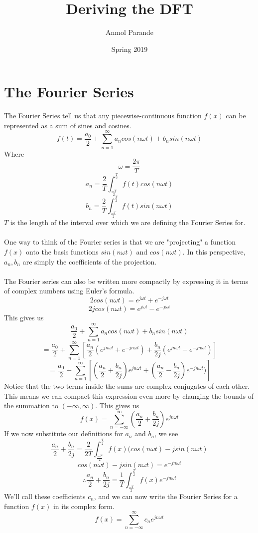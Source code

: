 \documentclass{article}
\begin{document}
\title{Deriving the DFT}
\author{Anmol Parande}
\date{Spring 2019}
\maketitle
\section{The Fourier Series}
The Fourier Series tell us that any piecewise-continuous function $f(x)$ can be represented as a sum of sines and cosines.
$$f(t) = \frac{a_0}{2} + \sum_{n=1}^{\infty}{a_n cos(n\omega t)+b_n sin(n\omega t)}$$
Where
$$\omega = \frac{2\pi}{T}$$
$$a_n = \frac{2}{T}\int_{\frac{-T}{2}}^{\frac{T}{2}}{f(t)cos(n\omega t)}$$
$$b_n = \frac{2}{T}\int_{\frac{-T}{2}}^{\frac{T}{2}}{f(t)sin(n\omega t)}$$
$T$ is the length of the interval over which we are defining the Fourier Series for.\\\\
One way to think of the Fourier series is that we are "projecting" a function $f(x)$
onto the basis functions $sin(n\omega t)$ and $cos(n\omega t)$. In this perspective,
$a_n, b_n$ are simply the coefficients of the projection.\\\\
The Fourier series can also be written more compactly by expressing it in terms of complex numbers using Euler's formula.
$$2cos(n\omega t)=e^{j\omega t}+e^{-j\omega t}$$
$$2jcos(n\omega t)=e^{j\omega t}-e^{-j\omega t}$$
This gives us
$$\frac{a_0}{2} + \sum_{n=1}^{\infty}{a_n cos(n\omega t)+b_n sin(n\omega t)}$$
$$=\frac{a_0}{2} + \sum_{n=1}^{\infty}{\left[\frac{a_n}{2}(e^{jn\omega t}+e^{-jn\omega t})+\frac{b_n}{2j}(e^{jn\omega t}-e^{-jn\omega t})\right]}$$
$$=\frac{a_0}{2} + \sum_{n=1}^{\infty}{\left[(\frac{a_n}{2} + \frac{b_n}{2j})e^{jn\omega t}+(\frac{a_n}{2} - \frac{b_n}{2j})e^{-jn\omega t})\right]}$$
Notice that the two terms inside the sums are complex conjugates of each other.
This means we can compact this expression even more by changing the bounds of the summation to $(-\infty, \infty)$.
This gives us $$f(x) = \sum_{n=-\infty}^{\infty}{(\frac{a_n}{2} + \frac{b_n}{2j})e^{jn\omega t}}$$
If we now substitute our definitions for $a_n$ and $b_n$, we see
$$\frac{a_n}{2}+\frac{b_n}{2j} = \frac{2}{2T}\int_{\frac{-T}{2}}^{\frac{T}{2}}{f(x)(cos(n\omega t)-jsin(n\omega t)}$$ 
$$cos(n\omega t) - jsin(n \omega t) = e^{-jn\omega t}$$
$$\therefore \frac{a_n}{2}+\frac{b_n}{2j} = \frac{1}{T}\int_{\frac{-T}{2}}^{\frac{T}{2}}{f(x)e^{-jn\omega t}}$$
We'll call these coefficients $c_n$, and we can now write the Fourier Series for a function $f(x)$ in its complex form.
$$f(x) = \sum_{n=-\infty}^{\infty}{c_ne^{jn\omega t}}$$
\end{document}
